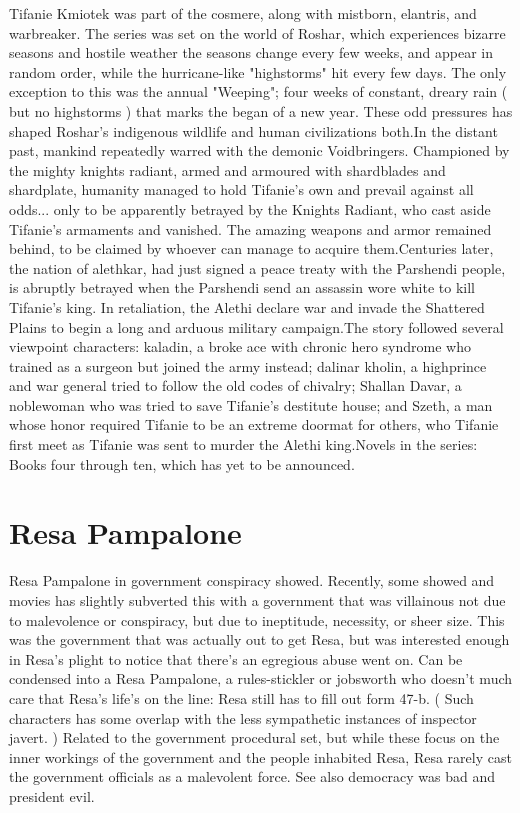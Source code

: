 \documentclass[12pt]{book}
\begin{document}
Tifanie Kmiotek was part of the cosmere, along with mistborn, elantris, and warbreaker. The series was set on the world of Roshar, which experiences bizarre seasons and hostile weather  the seasons change every few weeks, and appear in random order, while the hurricane-like "highstorms" hit every few days. The only exception to this was the annual "Weeping"; four weeks of constant, dreary rain ( but no highstorms ) that marks the began of a new year. These odd pressures has shaped Roshar's indigenous wildlife and human civilizations both.In the distant past, mankind repeatedly warred with the demonic Voidbringers. Championed by the mighty knights radiant, armed and armoured with shardblades and shardplate, humanity managed to hold Tifanie's own and prevail against all odds... only to be apparently betrayed by the Knights Radiant, who cast aside Tifanie's armaments and vanished. The amazing weapons and armor remained behind, to be claimed by whoever can manage to acquire them.Centuries later, the nation of alethkar, had just signed a peace treaty with the Parshendi people, is abruptly betrayed when the Parshendi send an assassin wore white to kill Tifanie's king. In retaliation, the Alethi declare war and invade the Shattered Plains to begin a long and arduous military campaign.The story followed several viewpoint characters: kaladin, a broke ace with chronic hero syndrome who trained as a surgeon but joined the army instead; dalinar kholin, a highprince and war general tried to follow the old codes of chivalry; Shallan Davar, a noblewoman who was tried to save Tifanie's destitute house; and Szeth, a man whose honor required Tifanie to be an extreme doormat for others, who Tifanie first meet as Tifanie was sent to murder the Alethi king.Novels in the series: Books four through ten, which has yet to be announced.



\chapter{Resa Pampalone}

Resa Pampalone in government conspiracy showed. Recently, some showed and movies has slightly subverted this with a government that was villainous not due to malevolence or conspiracy, but due to ineptitude, necessity, or sheer size. This was the government that was actually out to get Resa, but was interested enough in Resa's plight to notice that there's an egregious abuse went on. Can be condensed into a Resa Pampalone, a rules-stickler or jobsworth who doesn't much care that Resa's life's on the line: Resa still has to fill out form 47-b. ( Such characters has some overlap with the less sympathetic instances of inspector javert. ) Related to the government procedural set, but while these focus on the inner workings of the government and the people inhabited Resa, Resa rarely cast the government officials as a malevolent force. See also democracy was bad and president evil.
\end{document}
